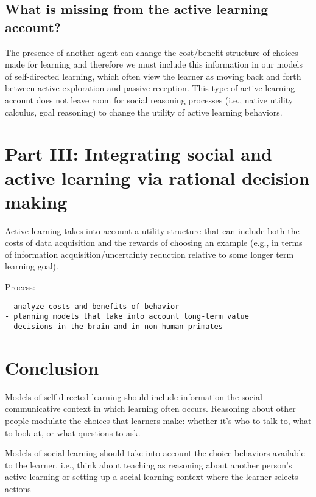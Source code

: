 \documentclass[a4paper,man,apacite,floatsintext]{apa6}
\begin{document}
\subsection{What is missing from the active learning
account?}\label{what-is-missing-from-the-active-learning-account}

The presence of another agent can change the cost/benefit structure of
choices made for learning and therefore we must include this information
in our models of self-directed learning, which often view the learner as
moving back and forth between active exploration and passive reception.
This type of active learning account does not leave room for social
reasoning processes (i.e., native utility calculus, goal reasoning) to
change the utility of active learning behaviors.

\section{Part III: Integrating social and active learning via rational
decision
making}\label{part-iii-integrating-social-and-active-learning-via-rational-decision-making}

Active learning takes into account a utility structure that can include
both the costs of data acquisition and the rewards of choosing an
example (e.g., in terms of information acquisition/uncertainty reduction
relative to some longer term learning goal).

Process:

\begin{verbatim}
- analyze costs and benefits of behavior
- planning models that take into account long-term value
- decisions in the brain and in non-human primates 
\end{verbatim}

\section{Conclusion}\label{conclusion}

Models of self-directed learning should include information the
social-communicative context in which learning often occurs. Reasoning
about other people modulate the choices that learners make: whether it's
who to talk to, what to look at, or what questions to ask.

Models of social learning should take into account the choice behaviors
available to the learner. i.e., think about teaching as reasoning about
another person's active learning or setting up a social learning context
where the learner selects actions
\end{document}
